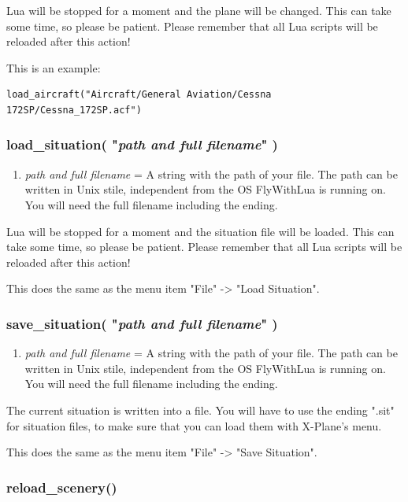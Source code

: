 \documentclass[11pt,parskip=half,a4paper]{scrartcl}
\begin{document}
Lua will be stopped for a moment and the plane will be changed. This can take some time, so please be patient. Please remember that all Lua scripts will be reloaded after this action!

This is an example:
\begin{lstlisting}
load_aircraft("Aircraft/General Aviation/Cessna 172SP/Cessna_172SP.acf")
\end{lstlisting}

\subsubsection{load\_situation( "\emph{path and full filename}" )}

\begin{enumerate}
	\item \emph{path and full filename} = A string with the path of your file. The path can be written in Unix stile, independent from the OS FlyWithLua is running on. You will need the full filename including the ending.
\end{enumerate}

Lua will be stopped for a moment and the situation file will be loaded. This can take some time, so please be patient. Please remember that all Lua scripts will be reloaded after this action!

This does the same as the menu item "File" -> "Load Situation".

\subsubsection{save\_situation( "\emph{path and full filename}" )}

\begin{enumerate}
	\item \emph{path and full filename} = A string with the path of your file. The path can be written in Unix stile, independent from the OS FlyWithLua is running on. You will need the full filename including the ending.
\end{enumerate}

The current situation is written into a file. You will have to use the ending ".sit" for situation files, to make sure that you can load them with X-Plane's menu.

This does the same as the menu item "File" -> "Save Situation".

\subsubsection{reload\_scenery()}
\end{document}
